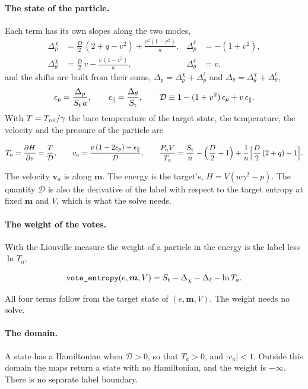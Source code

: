\documentclass[11pt,aps,preprint,nofootinbib,superscriptaddress,tightenlines]{revtex4-2}
\def\st{\begin{equation}}
\def\stp{\end{equation}}
\let\oldparagraph\paragraph
\renewcommand{\paragraph}{\par\bigskip\oldparagraph}
\begin{document}
\paragraph{The state of the particle.}  Each term has its own slopes along the two modes,
\begin{align}
\Delta_p^{\chi}&=\frac D2\,(2+q-v^2)+\frac{v^2(1-v^2)}a, & \Delta_p^{\ell}&=-(1+v^2), \nonumber\\
\Delta_\theta^{\chi}&=\frac D2\,v-\frac{v\,(1-v^2)}a, & \Delta_\theta^{\ell}&=v ,
\label{slopes1}
\end{align}
and the shifts are built from their sums, $\Delta_p=\Delta_p^\chi+\Delta_p^\ell$ and $\Delta_\theta=\Delta_\theta^\chi+\Delta_\theta^\ell$,
\st
\epsilon_p=\frac{\Delta_p}{S_{\rm t}\,a},\qquad \epsilon_\parallel=\frac{\Delta_\theta}{S_{\rm t}},\qquad
\mathcal D\equiv1-(1+v^2)\,\epsilon_p+v\,\epsilon_\parallel .
\stp
With $T=T_{\rm rel}/\gamma$ the bare temperature of the target state, the temperature, the velocity and the pressure of the particle are
\begin{keyeq}
\st
T_a=\frac{\partial H}{\partial s}=\frac T{\mathcal D},\qquad
v_a=\frac{v\,(1-2\epsilon_p)+\epsilon_\parallel}{\mathcal D},\qquad
\frac{P_aV}{T_a}=\frac{S_{\rm t}}n-\Big(\frac D2+1\Big)+\frac1n\Big[\frac D2\,(2+q)-1\Big] .
\label{state1}
\stp
\end{keyeq}
The velocity $\bm v_a$ is along $\bm m$.  The energy is the target's, $H=V(w\gamma^2-p)$.  The quantity $\mathcal D$ is also the derivative of the
label with respect to the target entropy at fixed $\bm m$ and $V$, which is what the solve needs.

\paragraph{The weight of the votes.}  With the Liouville measure the weight of a particle in the energy is the label less $\ln T_a$,
\begin{keyeq}
\st
\texttt{vote\_entropy}(e,\bm m,V)=S_{\rm t}-\Delta_\chi-\Delta_\ell-\ln T_a .
\label{weight}
\stp
\end{keyeq}
All four terms follow from the target state of $(e,\bm m,V)$.  The weight needs no solve.

\paragraph{The domain.}  A state has a Hamiltonian when $\mathcal D>0$, so that $T_a>0$, and $|v_a|<1$.  Outside this domain the maps return a state
with no Hamiltonian, and the weight is $-\infty$.  There is no separate label boundary.
\end{document}
